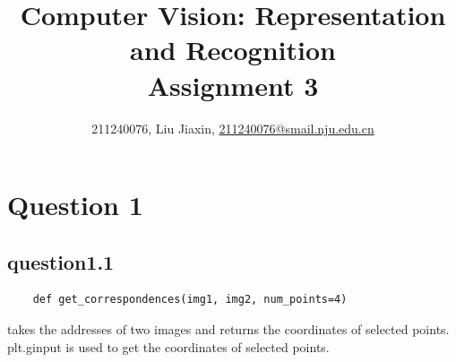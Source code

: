 \documentclass[a4paper,UTF8]{article}
\numberwithin{equation}{section}
\begin{document}
\title{Computer Vision: Representation and Recognition\\
	Assignment 3}
\author{211240076, Liu Jiaxin, \href{211240076@smail.nju.edu.cn}{211240076@smail.nju.edu.cn}}
\maketitle

\section{Question 1}

\subsection{question1.1}
\begin{lstlisting}
	def get_correspondences(img1, img2, num_points=4)
\end{lstlisting}
takes the addresses of two images and returns the coordinates of selected points.
plt.ginput is used to get the coordinates of selected points.
\end{document}
